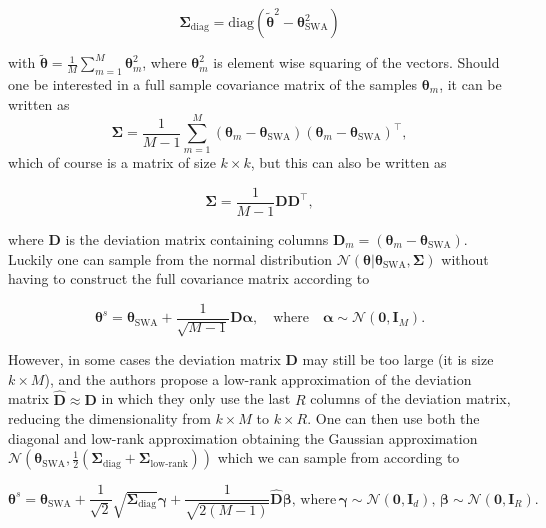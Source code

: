 \begin{equation}
    \bm{\Sigma}_\text{diag}=\text{diag}(\tilde{\bm{\theta}}^2-\bm{\theta}_\text{SWA}^2)
\end{equation}

\noindent with $\tilde{\bm{\theta}}=\frac{1}{M}\sum^M_{m=1}\bm{\theta}_m^2$, where $\bm{\theta}_m^2$ is element wise squaring of the vectors. Should one be interested in a full sample covariance matrix of the samples $\bm{\theta}_m$, it can be written as 
\begin{equation}
   \bm{\Sigma}=\frac{1}{M-1} \sum^M_{m=1}(\bm{\theta}_m-\bm{\theta}_{\text{SWA}})(\bm{\theta}_m-\bm{\theta}_{\text{SWA}})^\top,
\end{equation}
\noindent which of course is a matrix of size $k\times k$, but this can also be written as 

\begin{equation}
    \bm{\Sigma} = \frac{1}{M-1}\mathbf{DD}^\top,
\end{equation}

\noindent where $\mathbf{D}$ is the deviation matrix containing columns $\mathbf{D}_m=(\bm{\theta}_m-\bm{\theta}_{\text{SWA}})$. Luckily one can sample from the normal distribution $\mathcal{N}(\bm{\theta}|\bm{\theta}_{\text{SWA}}, \bm{\Sigma})$ without having to construct the full covariance matrix according to

\begin{equation}
    \bm{\theta}^s = \bm{\theta}_{\text{SWA}}+\frac{1}{\sqrt{M-1}}\mathbf{D}\bm{\alpha}, \quad \text{where} \quad \bm{\alpha} \sim \mathcal{N}(\mathbf{0}, \mathbf{I}_M).
\end{equation}

\noindent However, in some cases the deviation matrix $\bm{D}$ may still be too large (it is size $k\times M$), and the authors propose a low-rank approximation of the deviation matrix $\mathbf{\hat{D}}\approx \mathbf{D}$ in which they only use the last $R$ columns of the deviation matrix, reducing the dimensionality from $k\times M$ to $k\times R$. One can then use both the diagonal and low-rank approximation obtaining the Gaussian approximation $\mathcal{N}(\bm{\theta}_{\text{SWA}}, \frac{1}{2}(\bm{\Sigma}_\text{diag}+\bm{\Sigma}_\text{low-rank}))$ which we can sample from according to

\begin{equation}
    \bm{\theta}^s = \bm{\theta}_{\text{SWA}}+\frac{1}{\sqrt{2}}\sqrt{\bm{\Sigma}_\text{diag}}\bm{\gamma}+\frac{1}{\sqrt{2(M-1)}}\mathbf{\hat{D}}\bm{\beta}, \, \text{where} \, \bm{\gamma} \sim \mathcal{N}(\mathbf{0}, \mathbf{I}_d), \,  \bm{\beta} \sim \mathcal{N}(\mathbf{0}, \mathbf{I}_R).
\end{equation}

